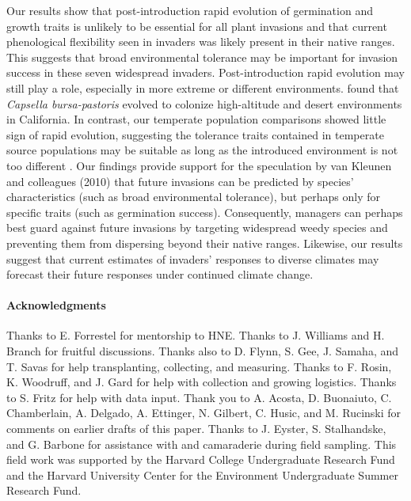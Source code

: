\documentclass[11pt]{article}\usepackage[]{graphicx}\usepackage[]{color}
\begin{document}
	Our results show that post-introduction rapid evolution of germination and growth traits is unlikely to be essential for all plant invasions and that current phenological flexibility seen in invaders was likely present in their native ranges. This suggests that broad environmental tolerance may be important for invasion success in these seven widespread invaders. Post-introduction rapid evolution may still play a role, especially in more extreme or different environments.  \textcite{Linde2001} found that \textit{Capsella bursa-pastoris} evolved to colonize high-altitude and desert environments in California. In contrast, our temperate population comparisons showed little sign of rapid evolution, suggesting the tolerance traits contained in temperate source populations may be suitable as long as the introduced environment is not too different \parencite{Baker1965}. Our findings provide support for  the speculation by van Kleunen and colleagues (2010) that future invasions can be predicted by species' characteristics (such as broad environmental tolerance), but perhaps only for specific traits (such as germination success). Consequently, managers can perhaps best guard against future invasions by targeting widespread weedy species and preventing them from dispersing beyond their native ranges. Likewise, our results suggest that current estimates of invaders' responses to diverse climates may forecast their future responses under continued climate change. 
	
\paragraph{Acknowledgments}
Thanks to E. Forrestel for mentorship to HNE. Thanks to J. Williams and H. Branch for fruitful discussions. Thanks also to D. Flynn, S. Gee, J. Samaha, and T. Savas for help transplanting, collecting, and measuring. Thanks to F. Rosin, K. Woodruff, and J. Gard for help with collection and growing logistics. Thanks to S. Fritz for help with data input. Thank you to A. Acosta, D. Buonaiuto, C. Chamberlain, A. Delgado, A. Ettinger, N. Gilbert, C. Husic, and M. Rucinski for comments on earlier drafts of this paper. Thanks to J. Eyster, S. Stalhandske, and G. Barbone for assistance with and camaraderie during field sampling. This field work was supported by the Harvard College Undergraduate Research Fund and the Harvard University Center for the Environment Undergraduate Summer Research Fund. %
\end{document}
